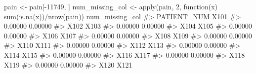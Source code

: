 \documentclass[
  letterpaper,
]{latex/krantz}
\makeatletter
\newenvironment{Shaded}{\begin{snugshade}}{\end{snugshade}}
\newcommand{\CommentTok}[1]{\textcolor[rgb]{0.37,0.37,0.37}{#1}}
\newcommand{\ControlFlowTok}[1]{\textcolor[rgb]{0.00,0.23,0.31}{#1}}
\newcommand{\DecValTok}[1]{\textcolor[rgb]{0.68,0.00,0.00}{#1}}
\newcommand{\FunctionTok}[1]{\textcolor[rgb]{0.28,0.35,0.67}{#1}}
\newcommand{\NormalTok}[1]{\textcolor[rgb]{0.00,0.23,0.31}{#1}}
\newcommand{\OtherTok}[1]{\textcolor[rgb]{0.00,0.23,0.31}{#1}}
\newcommand{\SpecialCharTok}[1]{\textcolor[rgb]{0.37,0.37,0.37}{#1}}
\newenvironment{kframe}{%
\medskip{}
\setlength{\fboxsep}{.8em}
 \def\at@end@of@kframe{}%
 \ifinner\ifhmode%
  \def\at@end@of@kframe{\end{minipage}}%
  \begin{minipage}{\columnwidth}%
 \fi\fi%
 \def\FrameCommand##1{\hskip\@totalleftmargin \hskip-\fboxsep
 \colorbox{shadecolor}{##1}\hskip-\fboxsep
     \hskip-\linewidth \hskip-\@totalleftmargin \hskip\columnwidth}%
 \MakeFramed {\advance\hsize-\width
   \@totalleftmargin\z@ \linewidth\hsize
   \@setminipage}}%
 {\par\unskip\endMakeFramed%
 \at@end@of@kframe}
\renewenvironment{Shaded}{\begin{kframe}}{\end{kframe}}
\makeatother
\begin{document}
\begin{Shaded}
\begin{Highlighting}[]
\NormalTok{pain }\OtherTok{\textless{}{-}}\NormalTok{ pain[}\SpecialCharTok{{-}}\DecValTok{11749}\NormalTok{, ]}
\NormalTok{num\_missing\_col }\OtherTok{\textless{}{-}} \FunctionTok{apply}\NormalTok{(pain, }\DecValTok{2}\NormalTok{, }
                         \ControlFlowTok{function}\NormalTok{(x) }\FunctionTok{sum}\NormalTok{(}\FunctionTok{is.na}\NormalTok{(x))}\SpecialCharTok{/}\FunctionTok{nrow}\NormalTok{(pain))}
\NormalTok{num\_missing\_col}
\CommentTok{\#\textgreater{}                      PATIENT\_NUM                             X101 }
\CommentTok{\#\textgreater{}                          0.00000                          0.00000 }
\CommentTok{\#\textgreater{}                             X102                             X103 }
\CommentTok{\#\textgreater{}                          0.00000                          0.00000 }
\CommentTok{\#\textgreater{}                             X104                             X105 }
\CommentTok{\#\textgreater{}                          0.00000                          0.00000 }
\CommentTok{\#\textgreater{}                             X106                             X107 }
\CommentTok{\#\textgreater{}                          0.00000                          0.00000 }
\CommentTok{\#\textgreater{}                             X108                             X109 }
\CommentTok{\#\textgreater{}                          0.00000                          0.00000 }
\CommentTok{\#\textgreater{}                             X110                             X111 }
\CommentTok{\#\textgreater{}                          0.00000                          0.00000 }
\CommentTok{\#\textgreater{}                             X112                             X113 }
\CommentTok{\#\textgreater{}                          0.00000                          0.00000 }
\CommentTok{\#\textgreater{}                             X114                             X115 }
\CommentTok{\#\textgreater{}                          0.00000                          0.00000 }
\CommentTok{\#\textgreater{}                             X116                             X117 }
\CommentTok{\#\textgreater{}                          0.00000                          0.00000 }
\CommentTok{\#\textgreater{}                             X118                             X119 }
\CommentTok{\#\textgreater{}                          0.00000                          0.00000 }
\CommentTok{\#\textgreater{}                             X120                             X121 }

\end{Highlighting}
\end{Shaded}
\end{document}
